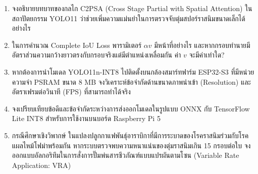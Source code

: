 \begin{tcolorbox}[colback=white, colframe=rbruNavy, title={\textbf{คำถามทบทวนและกรณีศึกษาประจำบทที่ 13}}]
\begin{enumerate}
    \item จงอธิบายบทบาทของกลไก C2PSA (Cross Stage Partial with Spatial Attention) ในสถาปัตยกรรม YOLO11 ว่าช่วยเพิ่มความแม่นยำในการตรวจจับตุ่มสปอร์ราสนิมขนาดเล็กได้อย่างไร
    \item ในการคำนวณ Complete IoU Loss พารามิเตอร์ $\alpha v$ มีหน้าที่อย่างไร และหากกรอบทำนายมีอัตราส่วนความกว้างยาวตรงกับกรอบจริงแต่มีตำแหน่งเหลื่อมกัน ค่า $v$ จะมีค่าเท่าใด?
    \item หากต้องการนำโมเดล YOLO11n-INT8 ไปติดตั้งบนกล้องสมาร์ทฟาร์ม ESP32-S3 ที่มีหน่วยความจำ PSRAM ขนาด 8 MB จงวิเคราะห์ข้อจำกัดด้านขนาดภาพนำเข้า (Resolution) และอัตราเฟรมต่อวินาที (FPS) ที่สามารถทำได้จริง
    \item จงเปรียบเทียบข้อดีและข้อจำกัดระหว่างการส่งออกโมเดลในรูปแบบ ONNX กับ TensorFlow Lite INT8 สำหรับการใช้งานบนบอร์ด Raspberry Pi 5
    \item กรณีศึกษาเชิงวิพากษ์ ในแปลงปลูกกาแฟพันธุ์อาราบิกาที่มีการระบาดของโรคราสนิมร่วมกับโรคแผลไหม้โฟม่าพร้อมกัน หากระบบตรวจพบความหนาแน่นของตุ่มราสนิมเกิน 15 กรอบต่อใบ จงออกแบบอัลกอริทึมในการสั่งการปั๊มพ่นสารชีวภัณฑ์แบบแปรผันตามโซน (Variable Rate Application: VRA)
\end{enumerate}
\end{tcolorbox}
